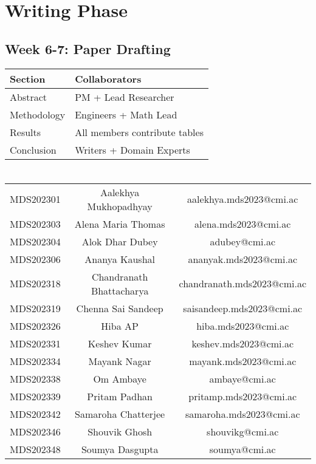 \documentclass[]{article}
\begin{document}
\section{Writing Phase}
\subsection*{Week 6-7: Paper Drafting}
\begin{tabularx}{\textwidth}{|l|X|}
\hline
\textbf{Section} & \textbf{Collaborators} \\ \hline
Abstract & PM + Lead Researcher \\ \hline
Methodology & Engineers + Math Lead \\ \hline
Results & All members contribute tables \\ \hline
Conclusion & Writers + Domain Experts \\ \hline
\end{tabularx}
\section{}
\begin{tabular}{|c|c|c|}
\hline
MDS202301&Aalekhya Mukhopadhyay&aalekhya.mds2023@cmi.ac\\
MDS202303&Alena Maria Thomas&alena.mds2023@cmi.ac\\
MDS202304&Alok Dhar Dubey&adubey@cmi.ac\\
MDS202306&Ananya Kaushal&ananyak.mds2023@cmi.ac\\
MDS202318&Chandranath Bhattacharya&chandranath.mds2023@cmi.ac\\
MDS202319&Chenna Sai Sandeep&saisandeep.mds2023@cmi.ac\\
MDS202326&Hiba AP&hiba.mds2023@cmi.ac\\
MDS202331&Keshev Kumar&keshev.mds2023@cmi.ac\\
MDS202334&Mayank Nagar&mayank.mds2023@cmi.ac\\
MDS202338&Om Ambaye&ambaye@cmi.ac\\
MDS202339&Pritam Padhan&pritamp.mds2023@cmi.ac\\
MDS202342&Samaroha Chatterjee&samaroha.mds2023@cmi.ac\\
MDS202346&Shouvik Ghosh&shouvikg@cmi.ac\\
MDS202348&Soumya Dasgupta&soumya@cmi.ac\\
\hline
\end{tabular}
\end{document}
